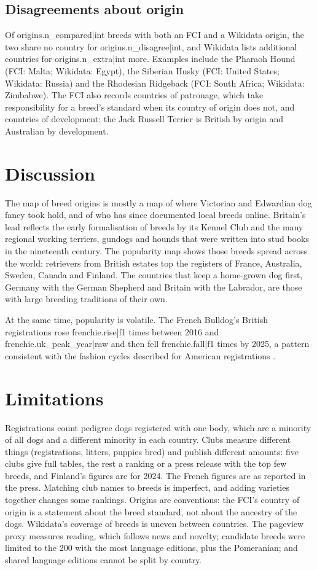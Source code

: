 \documentclass[11pt,a4paper]{article}
\begin{document}
\subsection{Disagreements about origin}
Of {{origins.n_compared|int}} breeds with both an FCI and a Wikidata origin, the two share no country for {{origins.n_disagree|int}}, and Wikidata lists additional countries for {{origins.n_extra|int}} more. Examples include the Pharaoh Hound (FCI: Malta; Wikidata: Egypt), the Siberian Husky (FCI: United States; Wikidata: Russia) and the Rhodesian Ridgeback (FCI: South Africa; Wikidata: Zimbabwe). The FCI also records countries of patronage, which take responsibility for a breed's standard when its country of origin does not, and countries of development: the Jack Russell Terrier is British by origin and Australian by development.

\section{Discussion}
The map of breed origins is mostly a map of where Victorian and Edwardian dog fancy took hold, and of who has since documented local breeds online. Britain's lead reflects the early formalisation of breeds by its Kennel Club and the many regional working terriers, gundogs and hounds that were written into stud books in the nineteenth century. The popularity map shows those breeds spread across the world: retrievers from British estates top the registers of France, Australia, Sweden, Canada and Finland. The countries that keep a home-grown dog first, Germany with the German Shepherd and Britain with the Labrador, are those with large breeding traditions of their own.

At the same time, popularity is volatile. The French Bulldog's British registrations rose {{frenchie.rise|f1}} times between 2016 and {{frenchie.uk_peak_year|raw}} and then fell {{frenchie.fall|f1}} times by 2025, a pattern consistent with the fashion cycles described for American registrations \citep{herzog2004,ghirlanda2013}.

\section{Limitations}
Registrations count pedigree dogs registered with one body, which are a minority of all dogs and a different minority in each country. Clubs measure different things (registrations, litters, puppies bred) and publish different amounts: five clubs give full tables, the rest a ranking or a press release with the top few breeds, and Finland's figures are for 2024. The French figures are as reported in the press. Matching club names to breeds is imperfect, and adding varieties together changes some rankings. Origins are conventions: the FCI's country of origin is a statement about the breed standard, not about the ancestry of the dogs. Wikidata's coverage of breeds is uneven between countries. The pageview proxy measures reading, which follows news and novelty; candidate breeds were limited to the 200 with the most language editions, plus the Pomeranian; and shared language editions cannot be split by country.
\end{document}

